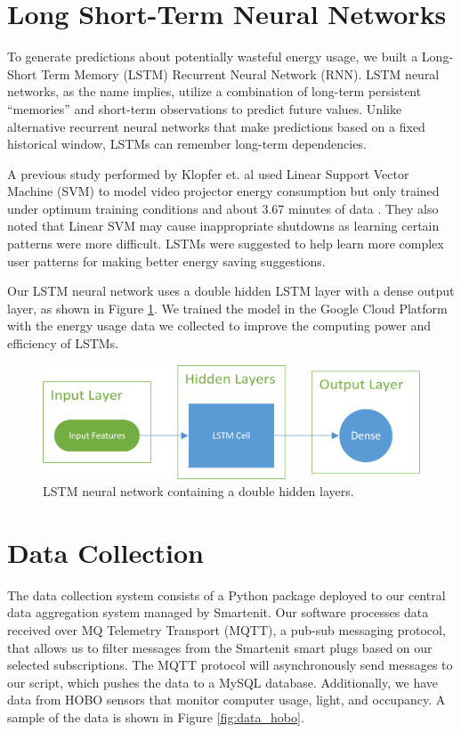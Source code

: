 \documentclass[conference]{IEEEtran}
\begin{document}
\section{Long Short-Term Neural Networks}
To generate predictions about potentially wasteful energy usage, we built a Long-Short Term Memory (LSTM) Recurrent Neural Network (RNN). LSTM neural networks, as the name implies, utilize a combination of long-term persistent “memories” and short-term observations to predict future values. Unlike alternative recurrent neural networks that make predictions based on a fixed historical window, LSTMs can remember long-term dependencies.

A previous study performed by Klopfer et. al used Linear Support Vector Machine (SVM) to model video projector energy consumption but only trained under optimum training conditions and about 3.67 minutes of data \cite{b3}. They also noted that Linear SVM may cause inappropriate shutdowns as learning certain patterns were more difficult. LSTMs were suggested to help learn more complex user patterns for making better energy saving suggestions.

Our LSTM neural network uses a double hidden LSTM layer with a dense output layer, as shown in Figure \ref{fig:lstm_model}. We trained the model in the Google Cloud Platform with the energy usage data we collected to improve the computing power and efficiency of LSTMs.

\begin{figure}[ht]
    \includegraphics[width=\linewidth]{img/model.png}
    \caption{LSTM neural network containing a double hidden layers.}
    \label{fig:lstm_model}
\end{figure}

\section{Data Collection}
The data collection system consists of a Python package deployed to our central data aggregation system managed by Smartenit. Our software processes data received over MQ Telemetry Transport (MQTT), a pub-sub messaging protocol, that allows us to filter messages from the Smartenit smart plugs based on our selected subscriptions. The MQTT protocol will asynchronously send messages to our script, which pushes the data to a MySQL database.  Additionally, we have data from HOBO sensors that monitor computer usage, light, and occupancy. A sample of the data is shown in Figure \ref{fig:data_hobo}.
\end{document}
